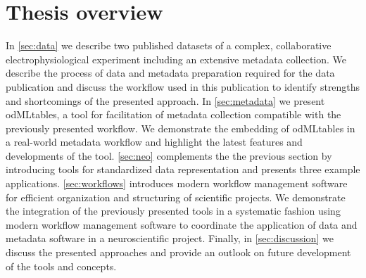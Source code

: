 \section{Thesis overview}
In \cref{sec:data} we describe two published datasets of a complex, collaborative electrophysiological experiment including an extensive metadata collection. We describe the process of data and metadata preparation required for the data publication and discuss the workflow used in this publication to identify strengths and shortcomings of the presented approach. In \cref{sec:metadata} we present odMLtables, a tool for facilitation of metadata collection compatible with the previously presented workflow. We demonstrate the embedding of odMLtables in a real-world metadata workflow and highlight the latest features and developments of the tool. \cref{sec:neo} complements the the previous section by introducing tools for standardized data representation and presents three example applications. \cref{sec:workflows} introduces modern workflow management software for efficient organization and structuring of scientific projects. We demonstrate the integration of the previously presented tools in a systematic fashion using modern workflow management software to coordinate the application of data and metadata software in a neuroscientific project. Finally, in \cref{sec:discussion} we discuss the presented approaches and provide an outlook on future development of the tools and concepts.




